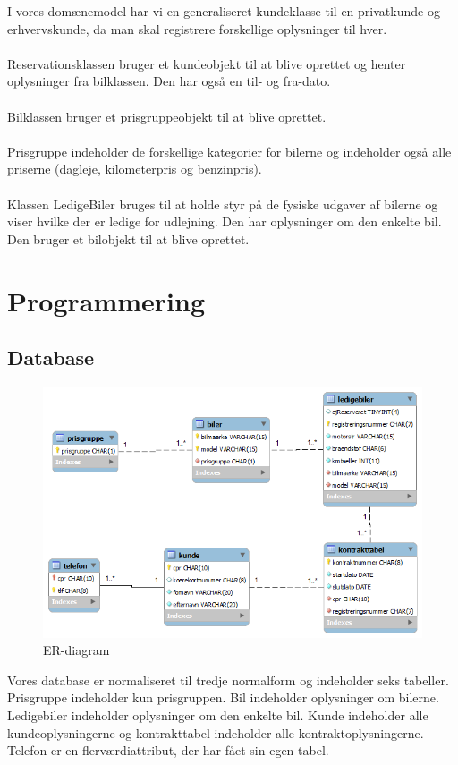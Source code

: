 \documentclass[11pt]{article}
\begin{document}
I vores domænemodel har vi en generaliseret kundeklasse til en privatkunde og erhvervskunde, da man skal registrere forskellige oplysninger til hver.\\\\
Reservationsklassen bruger et kundeobjekt til at blive oprettet og henter oplysninger fra bilklassen. Den har også en til- og fra-dato.\\\\
Bilklassen bruger et prisgruppeobjekt til at blive oprettet.\\\\
Prisgruppe indeholder de forskellige kategorier for bilerne og indeholder også alle priserne (dagleje, kilometerpris og benzinpris).\\\\
Klassen LedigeBiler bruges til at holde styr på de fysiske udgaver af bilerne og viser hvilke der er ledige for udlejning. Den har oplysninger om den enkelte bil. Den bruger et bilobjekt til at blive oprettet.

\section*{Programmering}
\subsection*{Database}
\begin{figure}
  \centering
  \includegraphics[width=15cm]{ER-diagram.png}
  \caption{ER-diagram}
  \label{fig:ER-diagram}
\end{figure}

Vores database er normaliseret til tredje normalform og indeholder seks tabeller. Prisgruppe indeholder kun prisgruppen. Bil indeholder oplysninger om bilerne. Ledigebiler indeholder oplysninger om den enkelte bil. Kunde indeholder alle kundeoplysningerne og kontrakttabel indeholder alle kontraktoplysningerne. Telefon er en flerværdiattribut, der har fået sin egen tabel.
\end{document}
